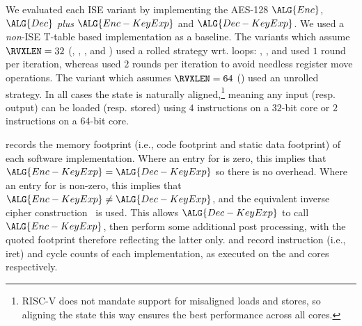 
We evaluated each ISE variant by implementing the AES-128
$\ALG{Enc}$,
$\ALG{Dec}$
{\em plus}
$\ALG{Enc-KeyExp}$
and
$\ALG{Dec-KeyExp}$.
We used a {\em non}-ISE 
T-table based
implementation as a baseline.
The variants which assume  $\RVXLEN = 32$
(, ,     , and )
used a    rolled strategy wrt. loops:
 , ,              and 
used  $1$ round  per iteration,
whereas
used $2$ rounds per iteration
to avoid needless register move operations.
The variant  which assumes $\RVXLEN = 64$
()
used an unrolled strategy.
In all cases the state is naturally aligned,\footnote{%
RISC-V does not mandate support for misaligned loads and stores, so
aligning the state this way ensures the best performance across all
cores.
} meaning any input (resp. output) can be loaded (resp. stored) 
using 
$4$  instructions on a $32$-bit core
or
$2$  instructions on a $64$-bit core.

records the
memory footprint (i.e., code footprint and static data footprint)
of each software implementation.
Where an entry for
is     zero, this implies that
$\ALG{Enc-KeyExp} =    \ALG{Dec-KeyExp}$
so there is no overhead.
Where an entry for
is non-zero, this implies that
$\ALG{Enc-KeyExp} \neq \ALG{Dec-KeyExp}$,
and the equivalent inverse cipher construction~\cite[Section 5.3.5]{FIPS:197}
is used.
This allows $\ALG{Dec-KeyExp}$ to
call $\ALG{Enc-KeyExp}$,
then
perform some additional post processing,
with the quoted footprint therefore reflecting the latter only.  
and
record
instruction (i.e., iret) and cycle counts
of each implementation,
as executed on the  and  cores respectively.

